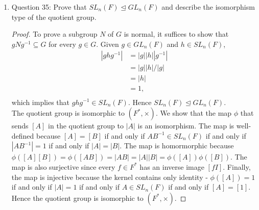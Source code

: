 \documentclass{article}
\begin{document}
\begin{enumerate}
\begin{enumerate}
\begin{enumerate}
\begin{proof}
              $\phi$ is surjective since every $sr^i\in D_{2k}$ has an
              inverse $sr^i$ in $D_{2n}$. It remains to show that $\phi$
              is injective. This is equivalent to showing that the kernel
              of $\phi$ contains only the identity $[1]$.
              In $D_{2k}$, two elements $r^{i_1}s^{j_1}$ and
              $r^{i_2}s^{j_2}$ are equal if and only if $i_1\equiv i_2
              \pmod{2}$ and $j_1\equiv j_2\pmod{k}$. Hence the inverse
              image of $\phi$ on $1=s^0r^0\in D_{2k}$ can only be of the
              form $[r^{4i}]$, where $i\in\mathbb{Z}$. Since
              $[r^{4i}]=[1]$, the kernel contains only the identity. So
              $\phi$ is an isomorphism, which completes our proof that the
              two groups are isomorphic.
            \end{proof}
        \end{enumerate}

      \item Question 35: Prove that $SL_n(F)\unlhd GL_n(F)$ and describe
        the isomorphism type of the quotient group.
        \begin{proof}
          To prove a subgroup $N$ of $G$ is normal, it suffices to show
          that $gNg^{-1}\subseteq G$ for every $g\in G$. Given $g\in
          GL_n(F)$ and $h\in SL_n(F)$,
          \begin{align*}
            |ghg^{-1}|  &= |g||h||g^{-1}| \\
                        &= |g||h|/|g|     \\
                        &= |h|            \\
                        &= 1,             \\
          \end{align*}
          which implies that $ghg^{-1}\in SL_n(F)$. Hence $SL_n(F)\unlhd
          GL_n(F)$. \\

          The quotient group is isomorphic to $(F^*,\times)$. We show that
          the map $\phi$ that sends $[A]$ in the quotient group to $|A|$ is
          an isomorphism. The map is well-defined because $[A]=[B]$ if and
          only if $AB^{-1}\in SL_n(F)$ if and only if $|AB^{-1}|=1$ if and
          only if $|A|=|B|$. The map is homormorphic because
          $\phi([A][B])=\phi([AB])=|AB|=|A||B|=\phi([A])\phi([B])$. The map
          is also surjective since every $f\in F^*$ has an inverse image
          $[fI]$. Finally, the map is injective because the kernel contains
          only identity - $\phi([A])=1$ if and only if $|A|=1$ if and only
          if $A\in SL_n(F)$ if and only if $[A]=[1]$. Hence the quotient
          group is isomorphic to $(F^*,\times)$.
        \end{proof}


\end{enumerate}
\end{enumerate}
\end{document}
